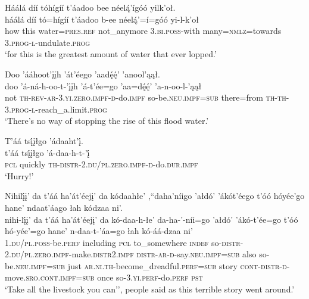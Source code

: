 \ea\label{ex:text6-11-14}
Háálá díí tóhígíí t’áadoo bee néelą́’ígóó yilk’oł.\\
\gll háálá	díí	tó=hígíí	t’áadoo	b-ee	néelą́’=í=góó	yi-l-k’oł\\
     how	this	water=\textsc{pres}.\textsc{ref}	not\_anymore	3.\textsc{bi}.\textsc{poss}-with	many=\textsc{nmlz}=towards	3.\textsc{prog}-\textsc{l}-undulate.\textsc{prog}\\
\glt `for this is the greatest amount of water that ever lopped.'
\z

\ea\label{ex:text6-11-15}
Doo ’ááhoot’įįh ’át’éego ’aadę́ę́’ ’anool’ąął.\\
\gll doo	’á-ná-h-oo-t-’įįh	’á-t’ée=go	’aa=dę́ę́’	’a-n-oo-l-’ąął\\
     not	\textsc{th}-\textsc{rev}-\textsc{ar}-3.\textsc{yi}.\textsc{zero}.\textsc{impf}-\textsc{d}-do.\textsc{impf}	so-be.\textsc{neu}.\textsc{impf}=\textsc{sub}	there=from	\textsc{th}-\textsc{th}-3.\textsc{prog}-\textsc{l}-reach\_a.limit.\textsc{prog}\\
\glt `There's no way of stopping the rise of this flood water.'
\z

\ea\label{ex:text6-11-16}
T’áá tsį́įłgo ’ádaaht’į́.\\
\gll t’áá	tsį́įłgo	’á-daa-h-t-’į́\\
     \textsc{pcl}	quickly	\textsc{th}-\textsc{distr}-2.\textsc{du}/\textsc{pl}.\textsc{zero}.\textsc{impf}-\textsc{d}-do.\textsc{dur}.\textsc{impf}\\
\glt `Hurry!'
\z

\ea\label{ex:text6-11-17}
Nihilį́į’ da t’áá ha’át’éejį’ da kódaahłe’ ,``daha’níigo ’ałdó’ ’ákót’éego t’óó hóyée’go hane’ ndaat’áago łah kódzaa ni’.\\
\gll nihi-lį́į’	da	t’áá	ha’át’éejį’	da	kó-daa-h-łe’	da-ha-’-níi=go	’ałdó’	’ákó-t’ée=go	t’óó	hó-yée’=go	hane’	n-daa-t-’áa=go	łah	kó-áá-dzaa	ni’\\
     1.\textsc{du}/\textsc{pl}.\textsc{poss}-be.\textsc{perf}	including	\textsc{pcl}	to\_somewhere	\textsc{indef}	so-\textsc{distr}-2.\textsc{du}/\textsc{pl}.\textsc{zero}.\textsc{impf}-make.\textsc{distr}2.\textsc{impf}	\textsc{distr}-\textsc{ar}-\textsc{d}-say.\textsc{neu}.\textsc{impf}=\textsc{sub}	also	so-be.\textsc{neu}.\textsc{impf}=\textsc{sub}	just	\textsc{ar}.\textsc{ni}.\textsc{th}-become\_dreadful.\textsc{perf}=\textsc{sub}	story	\textsc{cont}-\textsc{distr}-\textsc{d}-move.\textsc{sro}.\textsc{cont}.\textsc{impf}=\textsc{sub}	once	so-3.\textsc{yi}.\textsc{perf}-do.\textsc{perf}	\textsc{pst}\\
\glt `Take all the livestock you can'', people said as this terrible story went around.'
\z

